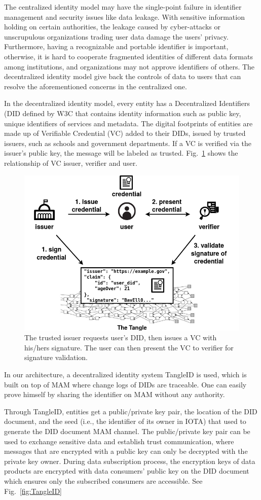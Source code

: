 \documentclass[conference]{IEEEtran}
\begin{document}
The centralized identity model may have the single-point failure in identifier management and security issues like data leakage. With sensitive information holding on certain authorities, the leakage caused by cyber-attacks or unscrupulous organizations trading user data damage the users' privacy. Furthermore, having a recognizable and portable identifier is important, otherwise, it is hard to cooperate fragmented identities of different data formats among institutions, and organizations may not approve identifiers of others. The decentralized identity model give back the controls of data to users that can resolve the aforementioned concerns in the centralized one.

In the decentralized identity model, every entity has a Decentralized Identifiers (DID\cite{DID} defined by W3C that contains identity information such as public key, unique identifiers of services and metadata. The digital footprints of entities are made up of Verifiable Credential (VC) added to their DIDs, issued by trusted issuers, such as schools and government departments. If a VC is verified via the issuer's public key, the message will be labeled as trusted. Fig.~\ref{fig:did_vc} shows the relationship of VC issuer, verifier and user.

\begin{figure}[h]
    \centering
    \includegraphics[width=3.in]{DID_VC}
    \caption{The trusted issuer requests user's DID, then issues a VC with his/hers signature. The user can then present the VC to verifier for signature validation.}
    \label{fig:did_vc}
\end{figure}

In our architecture, a decentralized identity system TangleID\cite{TangleID} is used, which is built on top of MAM where change logs of DIDs are traceable. One can easily prove himself by sharing the identifier on MAM without any authority.

Through TangleID, entities get a public/private key pair, the location of the DID document, and the seed (i.e., the identifier of its owner in IOTA) that used to generate the DID document MAM channel. The public/private key pair can be used to exchange sensitive data and establish trust communication, where messages that are encrypted with a public key can only be decrypted with the private key owner. During data subscription process, the encryption keys of data products are encrypted with data consumers' public key on the DID document which ensures only the subscribed consumers are accessible. See Fig.~\ref{fig:TangleID}
\end{document}
